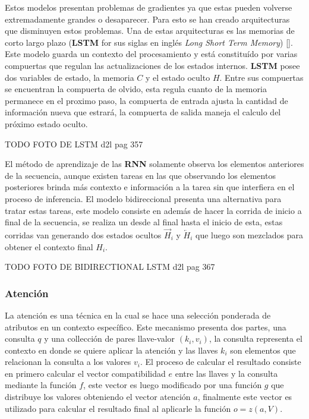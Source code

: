 Estos modelos presentan problemas de gradientes ya que estas pueden volverse extremadamente grandes o desaparecer.
Para esto se han creado arquitecturas que disminuyen estos problemas. Una de estas arquitecturas es las memorias
de corto largo plazo (\textbf{LSTM} for sus siglas en inglés \emph{Long Short Term Memory}) [\cite{TODO lstm}].
Este modelo guarda un contexto del procesamiento y está constituído por varias compuertas que regulan las 
actualizaciones de los estados internos. \textbf{LSTM} posee dos variables de estado, la memoria $C$ y el estado 
oculto $H$. Entre sus compuertas se encuentran la compuerta de olvido, esta regula cuanto de la memoria permanece
en el proximo paso, la compuerta de entrada ajusta la cantidad de información nueva que estrará, la compuerta 
de salida maneja el calculo del próximo estado oculto.

TODO FOTO DE LSTM d2l pag 357

El método de aprendizaje de las \textbf{RNN} solamente observa los elementos anteriores de la secuencia, aunque existen
tareas en las que observando los elementos posteriores brinda más contexto e información a la tarea sin que interfiera
en el proceso de inferencia. El modelo bidireccional presenta una alternativa para tratar estas tareas, este modelo
consiste en además de hacer la corrida de inicio a final de la secuencia, se realiza un desde al final hasta el  
inicio de esta, estas corridas van generando dos estados ocultos $\overrightarrow{H}_{i}$ y $\overleftarrow{H}_{i}$
que luego son mezclados para obtener el contexto final $H_i$.

TODO FOTO DE BIDIRECTIONAL LSTM d2l pag 367

\subsubsection{Atención}

La atención es una técnica en la cual se hace una selección ponderada de atributos en un contexto específico. 
Este mecanismo presenta dos partes, una consulta $q$ y una collección de pares llave-valor $(k_i, v_i)$, la 
consulta representa el contexto en donde se quiere aplicar la atención y las llaves $k_i$ son elementos que 
relacionan la consulta a los valores $v_i$. El proceso de calcular el resultado consiste en primero calcular 
el vector compatibilidad $e$ entre las llaves y la consulta mediante la función $f$, este vector es luego 
modificado por una función $g$ que distribuye los valores obteniendo el vector atención $a$, finalmente 
este vector es utilizado para calcular el resultado final al aplicarle la función $o = z(a, V)$.

